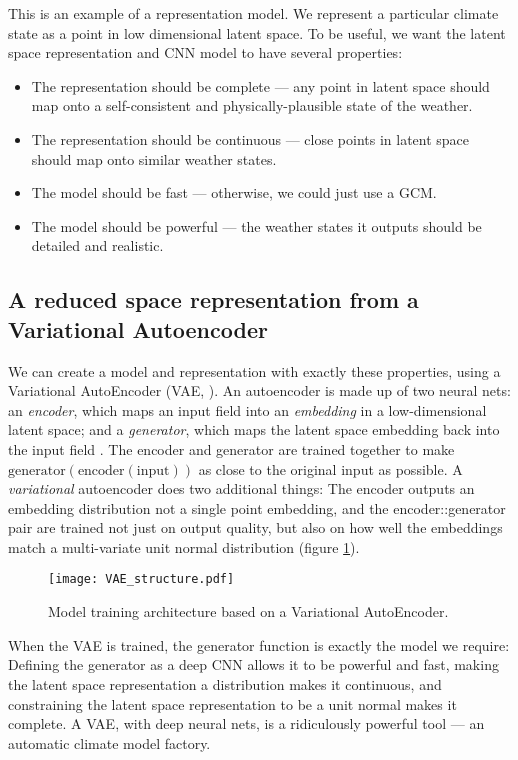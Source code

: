 \documentclass{ametsocV6.1}
\begin{document}
This is an example of a representation model. We represent a particular climate state as a point in low dimensional latent space. To be useful, we want the latent space representation and CNN model to have several properties:
\begin{itemize}
    \item The representation should be complete --- any point in latent space should map onto a self-consistent and physically-plausible state of the weather.
    \item The representation should be continuous --- close points in latent space should map onto similar weather states.
    \item The model should be fast --- otherwise, we could just use a GCM.
    \item The model should be powerful --- the weather states it outputs should be detailed and realistic.
\end{itemize}

    
\subsection{A reduced space representation from a Variational Autoencoder}

We can create a model and representation with exactly these properties, using a Variational AutoEncoder (VAE, \citet{VAE_Intro}). An autoencoder is made up of two neural nets: an {\it encoder}, which maps an input field into an {\it embedding} in a low-dimensional latent space; and a {\it generator}, which maps the latent space embedding back into the input field \citep{Autoencoder}. The encoder and generator are trained together to make $\textrm{generator}(\textrm{encoder}(\textrm{input}))$ as close to the original input as possible. A {\it variational} autoencoder does two additional things: The encoder outputs an embedding distribution not a single point embedding, and the encoder::generator pair are trained not just on output quality, but also on how well the embeddings match a multi-variate unit normal distribution (figure \ref{VAE_structure}).

\begin{figure}[h]
\texttt{[image: VAE\_structure.pdf]}
\caption{Model training architecture based on a Variational AutoEncoder.}
\label{VAE_structure}
\end{figure}

When the VAE is trained, the generator function is exactly the model we require: Defining the generator as a deep CNN allows it to be powerful and fast, making the latent space representation a distribution makes it continuous, and constraining the latent space representation to be a unit normal makes it complete. A VAE, with deep neural nets, is a ridiculously powerful tool --- an automatic climate model factory.
     
\end{document}
